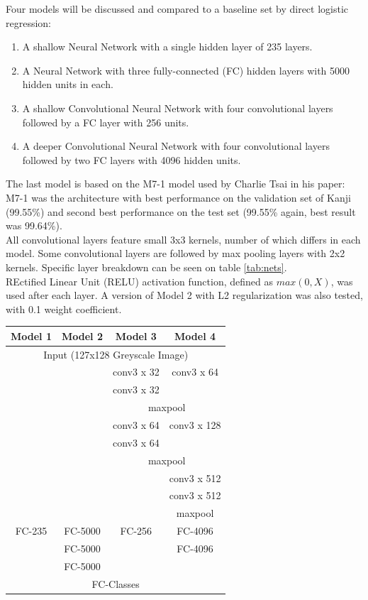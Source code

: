 \documentclass{article}
\begin{document}
\begin{CJK*}{UTF8}{min}
Four models will be discussed and compared to a baseline set by direct logistic regression:
\begin{enumerate}
    \item A shallow Neural Network with a single hidden layer of 235 layers.
    \item A Neural Network with three fully-connected (FC) hidden layers with 5000 hidden units in each.
    \item A shallow Convolutional Neural Network with four convolutional layers followed by a FC layer with 256 units.
    \item A deeper Convolutional Neural Network with four convolutional layers followed by two FC layers with 4096 hidden units.
\end{enumerate}
The last model is based on the M7-1 model used by Charlie Tsai in his paper: M7-1 was the architecture with best performance on the validation set of Kanji (99.55\%) and second best performance on the test set (99.55\% again, best result was 99.64\%).\\
All convolutional layers feature small 3x3 kernels, number of which differs in each model. Some convolutional layers are followed by max pooling layers with 2x2 kernels. Specific layer breakdown can be seen on table \ref{tab:nets}.\\
REctified Linear Unit (RELU) activation function, defined as $max(0,X)$, was used after each layer.
A version of Model 2 with L2 regularization was also tested, with 0.1 weight coefficient.

\begin{table}[h]
    \centering
    \begin{tabular}{|c|c|c|c|}

    \hline
    Model 1 &Model 2 & Model 3 & Model 4\\[0.5ex]
    \hline\hline
    \multicolumn{4}{|c|}{Input (127x128 Greyscale Image)}\\
    \hline
    &     & conv3 x 32 & conv3 x 64 \\
    &     & conv3 x 32 & \\ \cline{3-4}
    &     & \multicolumn{2}{c|}{maxpool}\\\cline{3-4}
    &     &   conv3 x 64   & conv3 x 128 \\
     &     &   conv3 x 64   &  \\
    \cline{3-4}
    &     &  \multicolumn{2}{c|}{maxpool}\\\cline{3-4}

    &     &      & conv3 x 512 \\
    &     &      & conv3 x 512 \\\cline{4-4}
    &     &      & maxpool\\
    \hline
    FC-235 & FC-5000 & FC-256 & FC-4096\\
           & FC-5000 &         & FC-4096\\
           & FC-5000 &         &\\
    \hline
    \multicolumn{4}{|c|}{FC-Classes}\\
    \hline


\end{tabular}
\end{table}
\end{CJK*}
\end{document}
